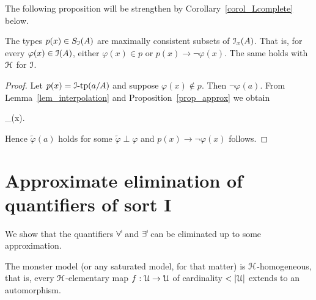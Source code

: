 \documentclass[10pt,oneside]{amsproc}
\renewcommand*{\emph}[1]{%
   \smash{\tikz[baseline]\node[rectangle, fill=teal!25, rounded corners, inner xsep=0.5ex, inner ysep=0.2ex, anchor=base, minimum height = 2.7ex]{\strut #1};}}
\begin{document}
 The following proposition will be strengthen by Corollary~\ref{corol_Lcomplete} below.

 \begin{proposition}\label{prop_Hcomplete2}
   The types $p(x)\in S_{\EuScript I}(A)$ are maximally consistent subsets of ${\EuScript I}_x(A)$.
   That is, for every $\varphi(x)\in{\EuScript I}(A)$, either $\varphi(x)\in p$ or $p(x)\rightarrow\neg\varphi(x)$.
   The same holds with ${\EuScript H}$ for ${\EuScript I}$.
 \end{proposition}

 \begin{proof}
  Let $p(x)={\EuScript I}\mbox{-tp}(a/A)$ and suppose $\varphi(x)\notin p$.
  Then $\neg\varphi(a)$.
  From Lemma~\ref{lem_interpolation} and Proposition~\ref{prop_approx} we obtain

  {\rightarrow}
  {\bigvee_{\tilde{\varphi}\perp\varphi}\tilde{\varphi}(x).}

  Hence $\tilde{\varphi}(a)$ holds for some $\tilde{\varphi}\perp\varphi$ and $p(x)\rightarrow\neg\varphi(x)$ follows.
 \end{proof}








\section{Approximate elimination of quantifiers of sort \textsf{I}}

We show that the quantifiers $\forall\raisebox{1.1ex}{\scaleto{\sf I}{.8ex}\kern-.2ex}$ and $\exists\raisebox{1.1ex}{\scaleto{\sf I}{.8ex}\kern-.2ex}$ can be eliminated up to some approximation.

\begin{proposition}
  The monster model (or any saturated model, for that matter) is ${\EuScript H}$-homogeneous, that is, every ${\EuScript H}$-elementary map $f:{\EuScript U}\to{\EuScript U}$ of cardinality $<|{\EuScript  U}|$ extends to an automorphism.
\end{proposition}
\end{document}
